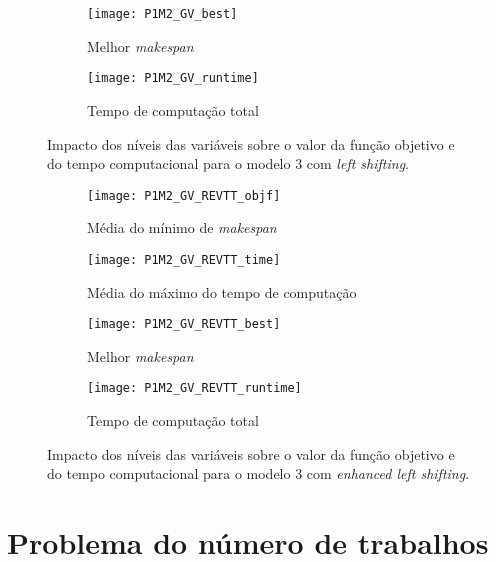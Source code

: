 \begin{figure}[H]
	\centering
	\begin{subfigure}{0.49\textwidth}
	\centering
		\texttt{[image: P1M2\_GV\_best]}
		\caption{Melhor \textit{makespan}}
		\label{fig:P1M2_GV_best}
	\end{subfigure}
	\begin{subfigure}{0.49\textwidth}
	\centering
		\texttt{[image: P1M2\_GV\_runtime]}
		\caption{Tempo de computação total}
		\label{fig:P1M2_GV_runtime}
	\end{subfigure}
	\caption{Impacto dos níveis das variáveis sobre o valor da função objetivo e do tempo computacional para o modelo 3 com \textit{left shifting}.}
	\label{fig:P1M2_GV_alt}
\end{figure}

\begin{figure}[H]
	\centering
	\begin{subfigure}{0.49\textwidth}
	\centering
		\texttt{[image: P1M2\_GV\_REVTT\_objf]}
		\caption{Média do mínimo de \textit{makespan}}
		\label{fig:P1M2_GV_REVTT_objf}
	\end{subfigure}
	\begin{subfigure}{0.49\textwidth}
	\centering
		\texttt{[image: P1M2\_GV\_REVTT\_time]}
		\caption{Média do máximo do tempo de computação}
		\label{fig:P1M2_GV_REVTT_time}
	\end{subfigure}
	\label{fig:P1M2_GV_REVTT_alt}
	\centering
	\begin{subfigure}{0.49\textwidth}
	\centering
		\texttt{[image: P1M2\_GV\_REVTT\_best]}
		\caption{Melhor \textit{makespan}}
		\label{fig:P1M2_GV_REVTT_best}
	\end{subfigure}
	\begin{subfigure}{0.49\textwidth}
	\centering
		\texttt{[image: P1M2\_GV\_REVTT\_runtime]}
		\caption{Tempo de computação total}
		\label{fig:P1M2_GV_REVTT_runtime}
	\end{subfigure}
	\caption{Impacto dos níveis das variáveis sobre o valor da função objetivo e do tempo computacional para o modelo 3 com \textit{enhanced left shifting}.}
	\label{fig:P1M2_GV_REVTT_alt}
\end{figure}

\section{Problema do número de trabalhos}

